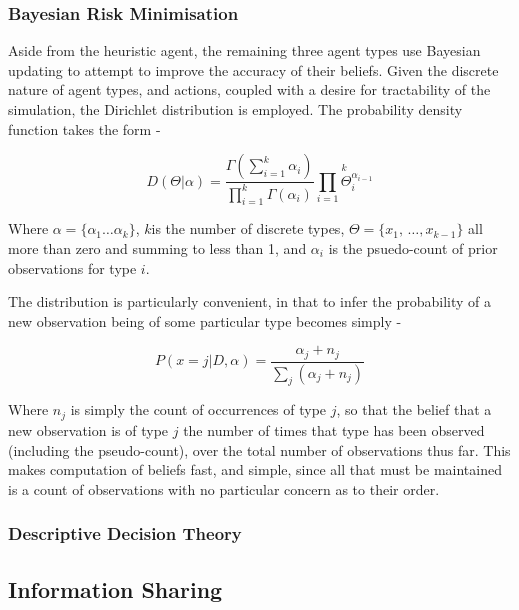\subsubsection{Bayesian Risk Minimisation}

Aside from the heuristic agent, the remaining three agent types use Bayesian updating to attempt to improve
the accuracy of their beliefs. Given the discrete nature of agent
types, and actions, coupled with a desire for tractability of the
simulation, the Dirichlet distribution is employed. The probability
density function takes the form -

\[
D(\Theta|\alpha)=\frac{\Gamma(\sum_{i=1}^{k}\alpha_{i})}{\prod_{i=1}^{k}\Gamma(\alpha_{i})}\overset{k}{\underset{i=1}{\prod}\Theta_{i}^{\alpha_{i-1}}}
\]


Where \(\alpha=\{\alpha_{1}\ldots\alpha_{k}\}\), \(k\)is the number
of discrete types, \(\Theta=\{x_{1},\,\ldots,x_{k-\text{1}}\}\) all
more than zero and summing to less than 1, and \(\alpha_{i}\) is the
psuedo-count of prior observations for type \(i\). 

The distribution is particularly convenient, in that to infer the
probability of a new observation being of some particular type becomes
simply -

\begin{equation}
P(x=j|D,\alpha)=\frac{\alpha_{j}+n_{j}}{\sum_{j}(\alpha_{j}+n_{j})}\label{eq:posterior}
\end{equation}


Where \(n_{j}\) is simply the count of occurrences of type \(j\), so
that the belief that a new observation is of type \(j\) the number
of times that type has been observed (including the pseudo-count),
over the total number of observations thus far. This makes computation
of beliefs fast, and simple, since all that must be maintained is
a count of observations with no particular concern as to their order. 

\subsubsection{Descriptive Decision Theory}

\subsection{Information Sharing}
\label{sub:info_sharing}

